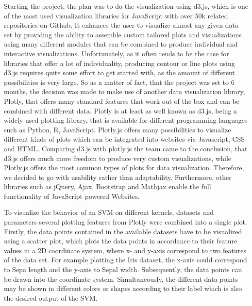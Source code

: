 \documentclass{scrartcl}
\begin{document}
Starting the project, the plan was to do the visualization using d3.js, which is one of the most used visualization libraries for JavaScript with over 50k related repositories on Github. It enhances the user to visualize almost any given data set by providing the ability to assemble custom tailored plots and visualizations using many different modules that can be combined to produce individual and interactive visualizations. Unfortunately, as it often tends to be the case for libraries that offer a lot of individuality, producing contour or line plots using d3.js requires quite some effort to get started with, as the amount of different possibilities is very large. So as a matter of fact, that the project was set to 6 months, the decision was made to make use of another data visualization library, Plotly, that offers many standard features that work out of the box and can be combined with different data.
Plotly is at least as well known as d3.js, being a widely used plotting library, that is available for different programming languages such as Python, R, JavaScript. Plotly.js offers many possibilities to visualize different kinds of plots which can be integrated into websites via Javascript, CSS and HTML. Comparing d3.js with plotly.js the team came to the conclusion, that d3.js offers much more freedom to produce very custom visualizations, while Plotly.js offers the most common types of plots for data visualization. Therefore, we decided to go with usability rather than adaptability.
Furthermore, other libraries such as jQuery, Ajax, Bootstrap and Mathjax enable the full functionality of JavaScript powered Websites.


To visualize the behavior of an SVM on different kernels, datasets and parameters several plotting features from Plotly were combined into a single plot. 
Firstly, the data points contained in the available datasets have to be visualized using a scatter plot, which plots the data points in accordance to their feature values in a 2D coordinate system, where x- and y-axis correspond to two features of the data set. 
For example plotting the Iris dataset, the x-axis could correspond to Sepa length and the y-axis to Sepal width. Subsequently, the data points can be drawn into the coordinate system. Simultaneously, the different data points may be shown in different colors or shapes according to their label which is also the desired output of the SVM.
\end{document}
